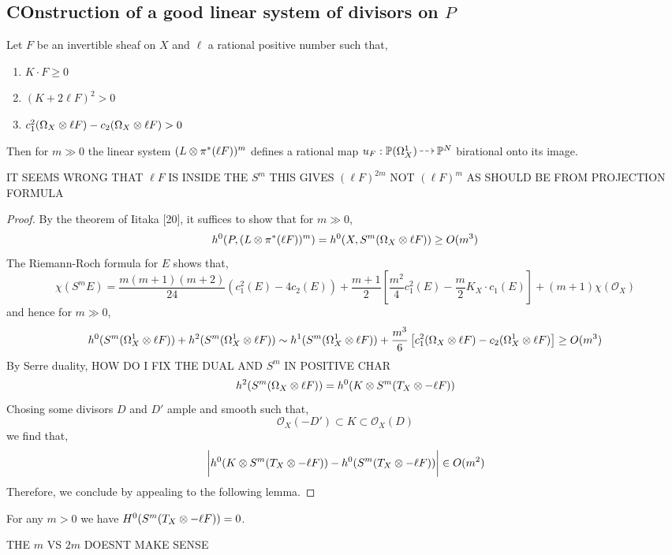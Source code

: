 \documentclass[12pt]{article}
\newcommand{\cO}{\mathcal{O}}
\begin{document}
\subsection{COnstruction of a good linear system of divisors on $P$}

\begin{prop}
Let $F$ be an invertible sheaf on $X$ and $\ell$ a rational positive number such that,
\begin{enumerate}
\item $K \cdot F \ge 0$
\item $(K + 2 \ell F)^2 > 0$
\item $c_1^2(\Omega_X \otimes \ell F) - c_2(\Omega_X \otimes \ell F) > 0$
\end{enumerate}
Then for $m \gg 0$ the linear system $(L \otimes \pi^* (\ell F))^m$ defines a rational map $u_F : \P(\Omega_X^1) \rat \P^N$ birational onto its image.
\end{prop}

{\color{red} IT SEEMS WRONG THAT $\ell F$ IS INSIDE THE $S^m$ THIS GIVES $(\ell F)^{2m}$ NOT $(\ell F)^{m}$ AS SHOULD BE FROM PROJECTION FORMULA}

\begin{proof}
By the theorem of Iitaka [20], it suffices to show that for $m \gg 0$,
\[ h^0(P, (L \otimes \pi^* (\ell F))^m) = h^0(X, S^m(\Omega_X \otimes \ell F)) \ge O(m^3) \]
The Riemann-Roch formula for $E$ shows that,
\[ \chi(S^m E) = \frac{m (m+1)(m+2)}{24} (c_1^2(E) - 4 c_2(E)) + \frac{m+1}{2} \left[ \frac{m^2}{4} c_1^2(E) - \frac{m}{2} K_X \cdot c_1(E) \right]  + (m + 1) \chi(\cO_X) \]
and hence for $m \gg 0$,
\[ h^0(S^m(\Omega_X^1 \otimes \ell F)) + h^2(S^m(\Omega_X^1 \otimes \ell F)) \sim h^1(S^m(\Omega_X^1 \otimes \ell F)) + \frac{m^3}{6} \left[ c_1^2(\Omega_X \otimes \ell F) - c_2(\Omega_X^1 \otimes \ell F) \right] \ge O(m^3) \]
By Serre duality, {\color{red} HOW DO I FIX THE DUAL AND $S^m$ IN POSITIVE CHAR}
\[ h^2(S^m(\Omega_X \otimes \ell F)) = h^0(K \otimes S^m(T_X \otimes -\ell F)) \]
Chosing some divisors $D$ and $D'$ ample and smooth such that,
\[ \cO_X(-D') \subset K \subset \cO_X(D) \]
we find that,
\[ \bigg| h^0(K \otimes S^m(T_X \otimes -\ell F)) - h^0(S^m(T_X \otimes -\ell F)) \bigg| \in O(m^2) \]
Therefore, we conclude by appealing to the following lemma.
\end{proof}

\begin{lemma}
For any $m > 0$ we have $H^0(S^m(T_X \otimes - \ell F)) = 0$.
\end{lemma}

{\color{red} THE $m$ VS $2m$ DOESNT MAKE SENSE}
\end{document}

